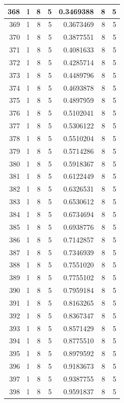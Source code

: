 \documentclass[
  letterpaper,
  DIV=11,
  numbers=noendperiod]{scrreprt}
\begin{document}
\begin{table}
\begin{tabular}[t]{r|l|r|r|r|r|r}
\hline
368 & l & 8 & 5 & 0.3469388 & 8 & 5\\
\hline
369 & l & 8 & 5 & 0.3673469 & 8 & 5\\
\hline
370 & l & 8 & 5 & 0.3877551 & 8 & 5\\
\hline
371 & l & 8 & 5 & 0.4081633 & 8 & 5\\
\hline
372 & l & 8 & 5 & 0.4285714 & 8 & 5\\
\hline
373 & l & 8 & 5 & 0.4489796 & 8 & 5\\
\hline
374 & l & 8 & 5 & 0.4693878 & 8 & 5\\
\hline
375 & l & 8 & 5 & 0.4897959 & 8 & 5\\
\hline
376 & l & 8 & 5 & 0.5102041 & 8 & 5\\
\hline
377 & l & 8 & 5 & 0.5306122 & 8 & 5\\
\hline
378 & l & 8 & 5 & 0.5510204 & 8 & 5\\
\hline
379 & l & 8 & 5 & 0.5714286 & 8 & 5\\
\hline
380 & l & 8 & 5 & 0.5918367 & 8 & 5\\
\hline
381 & l & 8 & 5 & 0.6122449 & 8 & 5\\
\hline
382 & l & 8 & 5 & 0.6326531 & 8 & 5\\
\hline
383 & l & 8 & 5 & 0.6530612 & 8 & 5\\
\hline
384 & l & 8 & 5 & 0.6734694 & 8 & 5\\
\hline
385 & l & 8 & 5 & 0.6938776 & 8 & 5\\
\hline
386 & l & 8 & 5 & 0.7142857 & 8 & 5\\
\hline
387 & l & 8 & 5 & 0.7346939 & 8 & 5\\
\hline
388 & l & 8 & 5 & 0.7551020 & 8 & 5\\
\hline
389 & l & 8 & 5 & 0.7755102 & 8 & 5\\
\hline
390 & l & 8 & 5 & 0.7959184 & 8 & 5\\
\hline
391 & l & 8 & 5 & 0.8163265 & 8 & 5\\
\hline
392 & l & 8 & 5 & 0.8367347 & 8 & 5\\
\hline
393 & l & 8 & 5 & 0.8571429 & 8 & 5\\
\hline
394 & l & 8 & 5 & 0.8775510 & 8 & 5\\
\hline
395 & l & 8 & 5 & 0.8979592 & 8 & 5\\
\hline
396 & l & 8 & 5 & 0.9183673 & 8 & 5\\
\hline
397 & l & 8 & 5 & 0.9387755 & 8 & 5\\
\hline
398 & l & 8 & 5 & 0.9591837 & 8 & 5\\

\end{tabular}
\end{table}
\end{document}

